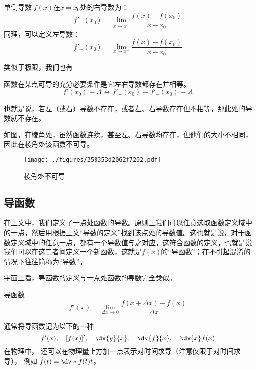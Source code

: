 \begin{definition}{单侧导数}\label{def_Der_1}
$f(x)$在$x=x_0$处的右导数为：
\begin{equation}
f'_+(x_0) = \lim_{x\to x_0^+} \frac{f(x)-f(x_0)}{x-x_0}
\end{equation}
同理，可以定义左导数：
\begin{equation}
f'_-(x_0) = \lim_{x\to x_0^-} \frac{f(x)-f(x_0)}{x-x_0}
\end{equation}
\end{definition}

类似于极限，我们也有
\begin{theorem}{}
函数在某点可导的充分必要条件是它左右导数都存在并相等。
$$f'(x_0)=A\Longleftrightarrow f'_+(x_0)=f'_-(x_0)=A$$

也就是说，若左（或右）导数不存在，或者左、右导数存在但不相等，那此处的导数就不存在。
\end{theorem}

\begin{example}{}
如图，在棱角处，虽然函数连续，甚至左、右导数均存在，但他们的大小不相同，因此在棱角处该函数不可导。
\begin{figure}[ht]
\centering
\texttt{[image: ./figures/358353d2062f7202.pdf]}
\caption{棱角处不可导} \label{fig_Der_21}
\end{figure}

\end{example}
\subsection{导函数}
在上文中，我们定义了一点处函数的导数。原则上我们可以任意选取函数定义域中的一点，然后用根据上文“导数的定义”找到该点处的导数值。这也就是说，对于函数定义域中的任意一点，都有一个导数值与之对应，这符合函数的定义，也就是说我们可以在这二者间定义一个新函数，这就是$f(x)$的“导函数”；在不引起混淆的情况下往往简称为“导数”。

字面上看，导函数的定义与一点处函数的导数完全类似。
\begin{definition}{导函数}
\begin{equation}
f'(x)=\lim_{\Delta x \to 0}\frac{f(x+\Delta x)-f(x)}{\Delta x}
\end{equation}
\end{definition}

通常将导函数记为以下的一种%
\begin{equation}\label{eq_Der_1}
f'(x),\quad [f(x)]',\quad \dv{y}{x},\quad \dv{f}{x},\quad \dv{x}f(x)
\end{equation}
在物理中， 还可以在物理量上方加一点表示对时间求导（注意仅限于对时间求导）， 例如 $\dot f(t) = \dv*{f(t)}{t}$。

